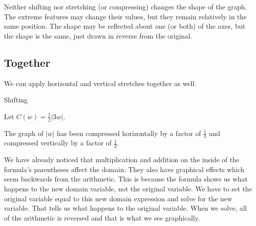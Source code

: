 \documentclass{ximera}
\begin{document}
Neither shifting nor stretching (or compressing) changes the shape of the graph.  The extreme features may change their values, but they remain relatively in the same position.  The shape may be reflected about one (or both) of the axes, but the shape is the same, just drawn in reverse from the original.





\subsection*{Together}

We can apply horizontal and vertical stretches together as well.





\begin{example}  Shifting

Let $C(w) = \frac{1}{2}|3w|$.


\begin{image}
\end{image}

\end{example}

The graph of $|w|$ has been compressed horizontally by a factor of $\frac{1}{3}$ and compressed vertically by a factor of $\frac{1}{2}$.




We have already noticed that multiplication and addition on the inside of the formula's parentheses affect the domain.  They also have graphical effects which seem backwards from the arithmetic.  This is because the formula shows us what happens to the new domain variable, not the original variable.  We have to set the original variable equal to this new domain expression and solve for the new variable.  That tells us what happens to the original variable.  When we solve, all of the arithmetic is reversed and that is what we see graphically.
\end{document}
